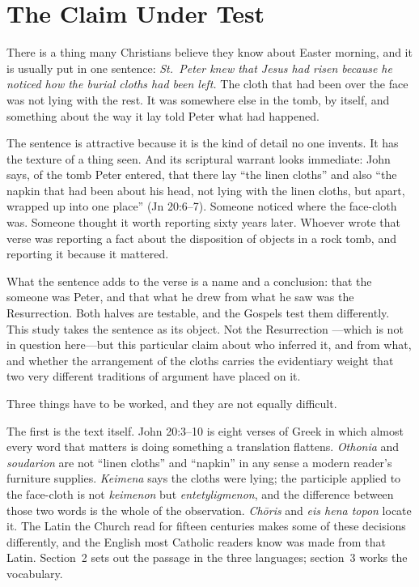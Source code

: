 \section{The Claim Under Test}

There is a thing many Christians believe they know about Easter morning, and
it is usually put in one sentence: \emph{St.\ Peter knew that Jesus had risen
because he noticed how the burial cloths had been left.} The cloth that had
been over the face was not lying with the rest. It was somewhere else in the
tomb, by itself, and something about the way it lay told Peter what had
happened.

The sentence is attractive because it is the kind of detail no one invents. It
has the texture of a thing seen. And its scriptural warrant looks immediate:
John says, of the tomb Peter entered, that there lay ``the linen cloths'' and
also ``the napkin that had been about his head, not lying with the linen
cloths, but apart, wrapped up into one place'' (Jn 20:6--7). Someone noticed
where the face-cloth was. Someone thought it worth reporting sixty years
later. Whoever wrote that verse was reporting a fact about the disposition of
objects in a rock tomb, and reporting it because it mattered.

What the sentence adds to the verse is a name and a conclusion: that the
someone was Peter, and that what he drew from what he saw was the
Resurrection. Both halves are testable, and the Gospels test them
differently. This study takes the sentence as its object. Not the Resurrection
---which is not in question here---but this particular claim about who
inferred it, and from what, and whether the arrangement of the cloths carries
the evidentiary weight that two very different traditions of argument have
placed on it.

Three things have to be worked, and they are not equally difficult.

The first is the text itself. John 20:3--10 is eight verses of Greek in which
almost every word that matters is doing something a translation flattens.
\emph{Othonia} and \emph{soudarion} are not ``linen cloths'' and ``napkin'' in
any sense a modern reader's furniture supplies. \emph{Keimena} says the cloths
were lying; the participle applied to the face-cloth is not \emph{keimenon} but
\emph{entetyligmenon}, and the difference between those two words is the whole
of the observation. \emph{Ch\=oris} and \emph{eis hena topon} locate it. The
Latin the Church read for fifteen centuries makes some of these decisions
differently, and the English most Catholic readers know was made from that
Latin. Section~2 sets out the passage in the three languages; section~3 works
the vocabulary.


